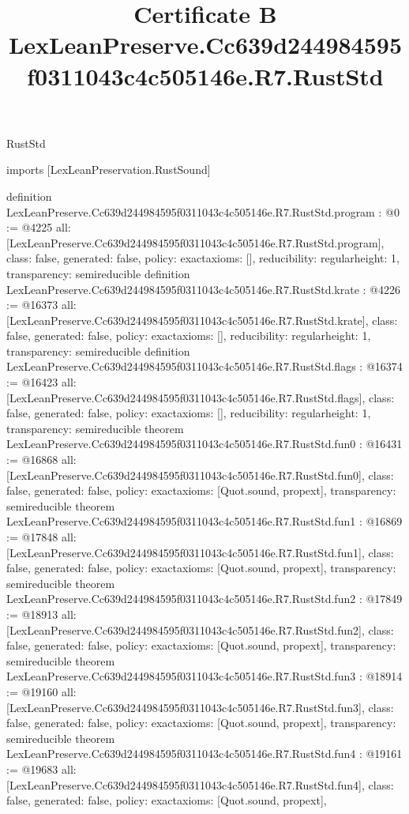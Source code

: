 \begin{lexlean}{RustStd}
\title{Certificate B LexLeanPreserve.Cc639d244984595f0311043c4c505146e.R7.RustStd}
\begin{coremodule}
imports [LexLeanPreservation.RustSound]

definition LexLeanPreserve.Cc639d244984595f0311043c4c505146e.R7.RustStd.program : @0 := @4225 {
  all: [LexLeanPreserve.Cc639d244984595f0311043c4c505146e.R7.RustStd.program],
  class: false,
  generated: false,
  policy: exact{axioms: []},
  reducibility: regular{height: 1},
  transparency: semireducible
}
definition LexLeanPreserve.Cc639d244984595f0311043c4c505146e.R7.RustStd.krate : @4226 := @16373 {
  all: [LexLeanPreserve.Cc639d244984595f0311043c4c505146e.R7.RustStd.krate],
  class: false,
  generated: false,
  policy: exact{axioms: []},
  reducibility: regular{height: 1},
  transparency: semireducible
}
definition LexLeanPreserve.Cc639d244984595f0311043c4c505146e.R7.RustStd.flags : @16374 := @16423 {
  all: [LexLeanPreserve.Cc639d244984595f0311043c4c505146e.R7.RustStd.flags],
  class: false,
  generated: false,
  policy: exact{axioms: []},
  reducibility: regular{height: 1},
  transparency: semireducible
}
theorem LexLeanPreserve.Cc639d244984595f0311043c4c505146e.R7.RustStd.fun0 : @16431 := @16868 {
  all: [LexLeanPreserve.Cc639d244984595f0311043c4c505146e.R7.RustStd.fun0],
  class: false,
  generated: false,
  policy: exact{axioms: [Quot.sound, propext]},
  transparency: semireducible
}
theorem LexLeanPreserve.Cc639d244984595f0311043c4c505146e.R7.RustStd.fun1 : @16869 := @17848 {
  all: [LexLeanPreserve.Cc639d244984595f0311043c4c505146e.R7.RustStd.fun1],
  class: false,
  generated: false,
  policy: exact{axioms: [Quot.sound, propext]},
  transparency: semireducible
}
theorem LexLeanPreserve.Cc639d244984595f0311043c4c505146e.R7.RustStd.fun2 : @17849 := @18913 {
  all: [LexLeanPreserve.Cc639d244984595f0311043c4c505146e.R7.RustStd.fun2],
  class: false,
  generated: false,
  policy: exact{axioms: [Quot.sound, propext]},
  transparency: semireducible
}
theorem LexLeanPreserve.Cc639d244984595f0311043c4c505146e.R7.RustStd.fun3 : @18914 := @19160 {
  all: [LexLeanPreserve.Cc639d244984595f0311043c4c505146e.R7.RustStd.fun3],
  class: false,
  generated: false,
  policy: exact{axioms: [Quot.sound, propext]},
  transparency: semireducible
}
theorem LexLeanPreserve.Cc639d244984595f0311043c4c505146e.R7.RustStd.fun4 : @19161 := @19683 {
  all: [LexLeanPreserve.Cc639d244984595f0311043c4c505146e.R7.RustStd.fun4],
  class: false,
  generated: false,
  policy: exact{axioms: [Quot.sound, propext]},
}
\end{coremodule}
\end{lexlean}
